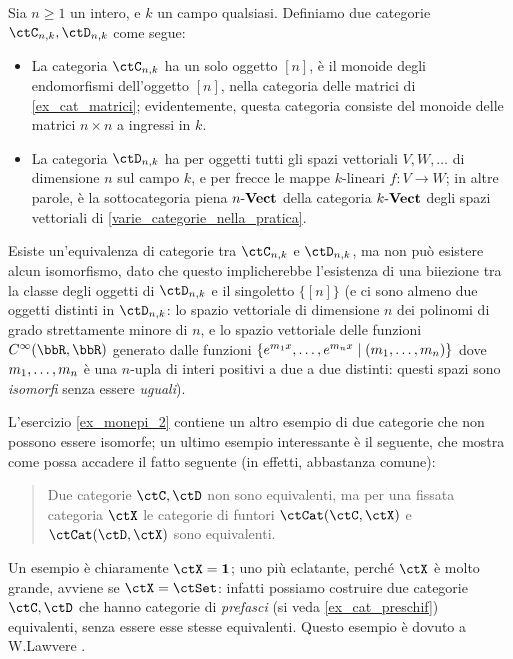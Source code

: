 \begin{example}
 Sia \(n\ge 1\) un intero, e \(k\) un campo qualsiasi. Definiamo due categorie \(\ctC_{n,k},\ctD_{n,k}\) come segue:
 \begin{itemize}
  \item La categoria \(\ctC_{n,k}\) ha un solo oggetto \([n]\), è il monoide degli endomorfismi dell'oggetto \([n]\), nella categoria delle matrici di \ref{ex_cat_matrici}; evidentemente, questa categoria consiste del monoide delle matrici \(n\times n\) a ingressi in \(k\).
  \item La categoria \(\ctD_{n,k}\) ha per oggetti tutti gli spazi vettoriali \(V,W,\dots\) di dimensione \(n\) sul campo \(k\), e per frecce le mappe \(k\)-lineari \(f \colon V\to W\); in altre parole, è la sottocategoria piena \(\ctVect[n]\) della categoria \(\ctVect[k]\) degli spazi vettoriali di \ref{varie_categorie_nella_pratica}.
 \end{itemize}
 Esiste un'equivalenza di categorie tra \(\ctC_{n,k}\) e \(\ctD_{n,k}\), ma non può esistere alcun isomorfismo, dato che questo implicherebbe l'esistenza di una biiezione tra la classe degli oggetti di \(\ctD_{n,k}\) e il singoletto \(\{[n]\}\) (e ci sono almeno due oggetti distinti in \(\ctD_{n,k}\): lo spazio vettoriale di dimensione \(n\) dei polinomi di grado strettamente minore di \(n\), e lo spazio vettoriale delle funzioni \(C^\infty(\bbR,\bbR)\) generato dalle funzioni \(\{e^{m_1 x},\dots,e^{m_n x} \mid (\tup mn,)\}\) dove \({\tup mn,}\) è una \(n\)-upla di interi positivi a due a due distinti: questi spazi sono \emph{isomorfi} senza essere \emph{uguali}).
\end{example}
\begin{example}
\end{example}
L'esercizio \ref{ex_monepi_2} contiene un altro esempio di due categorie che non possono essere isomorfe; un ultimo esempio interessante è il seguente, che mostra come possa accadere il fatto seguente (in effetti, abbastanza comune):
\begin{quote}
 Due categorie \(\ctC,\ctD\) non sono equivalenti, ma per una fissata categoria \(\ctX\) le categorie di funtori \(\Hom{\ctCat}(\ctC,\ctX)\) e \(\Hom{\ctCat}(\ctD,\ctX)\) sono equivalenti.
\end{quote}
Un esempio è chiaramente \(\ctX=\ctTerm\); uno più eclatante, perché \(\ctX\) è molto grande, avviene se \(\ctX=\ctSet\): infatti possiamo costruire due categorie \(\ctC,\ctD\) che hanno categorie di \emph{prefasci} (si veda \ref{ex_cat_preschif}) equivalenti, senza essere esse stesse equivalenti. Questo esempio è dovuto a W.\@ Lawvere  \cite{Lawvere1989Taco}.
